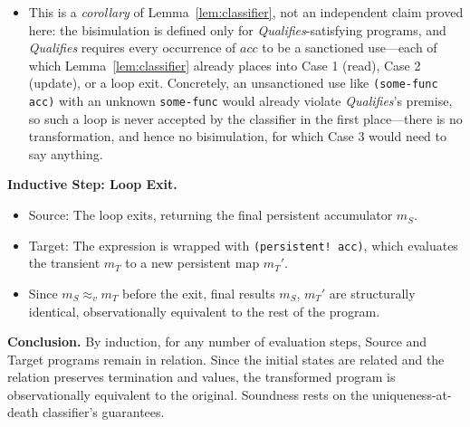 \documentclass[sigplan,review,anonymous]{acmart}
\begin{document}
\begin{itemize}
\begin{itemize}
        \item This is a \emph{corollary} of Lemma~\ref{lem:classifier}, not an independent claim proved here: the bisimulation is defined only for \emph{Qualifies}-satisfying programs, and \emph{Qualifies} requires every occurrence of $acc$ to be a sanctioned use---each of which Lemma~\ref{lem:classifier} already places into Case 1 (read), Case 2 (update), or a loop exit. Concretely, an unsanctioned use like \texttt{(some-func acc)} with an unknown \texttt{some-func} would already violate \emph{Qualifies}'s premise, so such a loop is never accepted by the classifier in the first place---there is no transformation, and hence no bisimulation, for which Case 3 would need to say anything.
    \end{itemize}
\end{itemize}

\textbf{Inductive Step: Loop Exit.}
\begin{itemize}
    \item Source: The loop exits, returning the final persistent accumulator $m_S$.
    \item Target: The expression is wrapped with \texttt{(persistent! acc)}, which evaluates the transient $m_T$ to a new persistent map $m_T'$.
    \item Since $m_S \approx_v m_T$ before the exit, final results $m_S$, $m_T'$ are structurally identical, observationally equivalent to the rest of the program.
\end{itemize}

\textbf{Conclusion.} By induction, for any number of evaluation steps, Source and Target programs remain in relation. Since the initial states are related and the relation preserves termination and values, the transformed program is observationally equivalent to the original. Soundness rests on the uniqueness-at-death classifier's guarantees.
\end{document}
